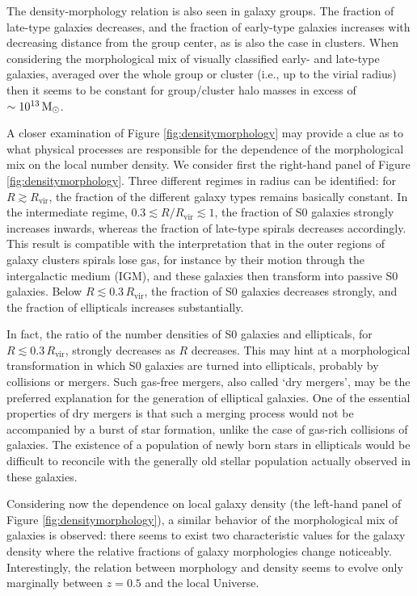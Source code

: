 \documentclass[a4paper,11pt]{article}
\begin{document}
{\noindent}The density-morphology relation is also seen in galaxy groups. The fraction of late-type galaxies decreases, and the fraction of early-type galaxies increases with decreasing distance from the group center, as is also the case in clusters. When considering the morphological mix of visually classified early- and late-type galaxies, averaged over the whole group or cluster (i.e., up to the virial radius) then it seems to be constant for group/cluster halo masses in excess of $\sim10^{13}\,{\rm M_\odot}$.

{\noindent}A closer examination of Figure \ref{fig:densitymorphology} may provide a clue as to what physical processes are responsible for the dependence of the morphological mix on the local number density. We consider first the right-hand panel of Figure \ref{fig:densitymorphology}. Three different regimes in radius can be identified: for $R\gtrsim R_\mathrm{vir}$, the fraction of the different galaxy types remains basically constant. In the intermediate regime, $0.3\lesssim R/R_\mathrm{vir}\lesssim1$, the fraction of S0 galaxies strongly increases inwards, whereas the fraction of late-type spirals decreases accordingly. This result is compatible with the interpretation that in the outer regions of galaxy clusters spirals lose gas, for instance by their motion through the intergalactic medium (IGM), and these galaxies then transform into passive S0 galaxies. Below $R\lesssim0.3\,R_\mathrm{vir}$, the fraction of S0 galaxies decreases strongly, and the fraction of ellipticals increases substantially.

{\noindent}In fact, the ratio of the number densities of S0 galaxies and ellipticals, for $R\lesssim0.3\,R_\mathrm{vir}$, strongly decreases as $R$ decreases. This may hint at a morphological transformation in which S0 galaxies are turned into ellipticals, probably by collisions or mergers. Such gas-free mergers, also called `dry mergers', may be the preferred explanation for the generation of elliptical galaxies. One of the essential properties of dry mergers is that such a merging process would not be accompanied by a burst of star formation, unlike the case of gas-rich collisions of galaxies. The existence of a population of newly born stars in ellipticals would be difficult to reconcile with the generally old stellar population actually observed in these galaxies.

{\noindent}Considering now the dependence on local galaxy density (the left-hand panel of Figure \ref{fig:densitymorphology}), a similar behavior of the morphological mix of galaxies is observed: there seems to exist two characteristic values for the galaxy density where the relative fractions of galaxy morphologies change noticeably. Interestingly, the relation between morphology and density seems to evolve only marginally between $z=0.5$ and the local Universe.
\end{document}
